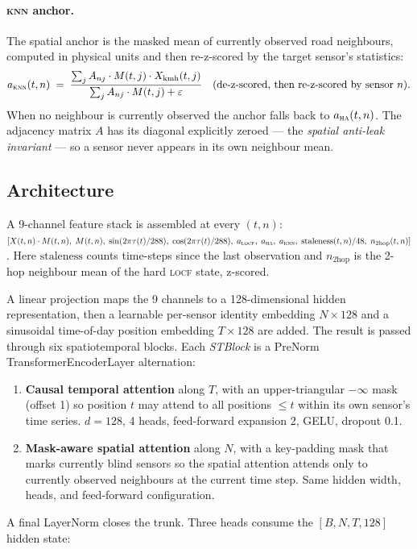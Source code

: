 \documentclass[11pt]{article}
\newcommand{\LOCF}{\textsc{locf}\xspace}
\newcommand{\HA}{\textsc{ha}\xspace}
\newcommand{\KNN}{\textsc{knn}\xspace}
\begin{document}
\paragraph{\KNN anchor.}  The spatial anchor is the masked mean of
currently observed road neighbours, computed in physical units and then
re-z-scored by the target sensor's statistics:
\begin{equation}
a_{\KNN}(t, n) \;=\;
\frac{ \sum_{j} A_{nj} \cdot M(t, j) \cdot X_{\text{kmh}}(t, j) }
     { \sum_{j} A_{nj} \cdot M(t, j) + \varepsilon }
\quad\text{(de-z-scored, then re-z-scored by sensor $n$)}.
\end{equation}
When no neighbour is currently observed the anchor falls back to
$a_{\HA}(t, n)$.  The adjacency matrix $A$ has its diagonal explicitly
zeroed --- the \emph{spatial anti-leak invariant} --- so a sensor never
appears in its own neighbour mean.

\subsection{Architecture}
\label{sec:model-arch}

A 9-channel feature stack is assembled at every $(t, n)$:
$[X(t,n) \cdot M(t,n),\; M(t,n),\; \sin(2\pi\tau(t)/288),\;
\cos(2\pi\tau(t)/288),\; a_{\LOCF},\; a_{\HA},\; a_{\KNN},\;
\mathrm{staleness}(t,n)/48,\; n_{\text{2hop}}(t,n)]$.  Here
$\mathrm{staleness}$ counts time-steps since the last observation and
$n_{\text{2hop}}$ is the 2-hop neighbour mean of the hard \LOCF state,
z-scored.

A linear projection maps the 9 channels to a 128-dimensional hidden
representation, then a learnable per-sensor identity embedding
$N \times 128$ and a sinusoidal time-of-day position embedding
$T \times 128$ are added.  The result is passed through six
spatiotemporal blocks.  Each \emph{STBlock} is a PreNorm
TransformerEncoderLayer alternation:
\begin{enumerate}
\item \textbf{Causal temporal attention} along $T$, with an
upper-triangular $-\infty$ mask (offset 1) so position $t$ may attend
to all positions $\leq t$ within its own sensor's time series.  $d=128$,
4 heads, feed-forward expansion 2, GELU, dropout 0.1.
\item \textbf{Mask-aware spatial attention} along $N$, with a
key-padding mask that marks currently blind sensors so the spatial
attention attends only to currently observed neighbours at the current
time step.  Same hidden width, heads, and feed-forward configuration.
\end{enumerate}
A final LayerNorm closes the trunk.  Three heads consume the
$[B, N, T, 128]$ hidden state:
\end{document}
